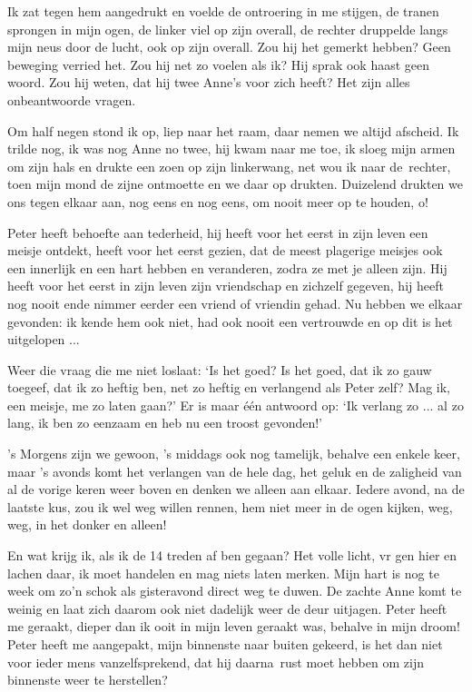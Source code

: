\documentclass{book}
\begin{document}
Ik zat tegen hem aangedrukt en voelde de ontroering in me stijgen, de
tranen sprongen in mijn ogen, de linker viel op zijn overall, de rechter
druppelde langs mijn neus door de lucht, ook op zijn overall. Zou hij
het gemerkt hebben? Geen beweging verried het. Zou hij net zo voelen als
ik? Hij sprak ook haast geen woord. Zou hij weten, dat hij twee Anne's
voor zich heeft? Het zijn alles onbeantwoorde vragen.

Om half negen stond ik op, liep naar het raam, daar nemen we altijd
afscheid. Ik trilde nog, ik was nog Anne no twee, hij kwam naar me toe,
ik sloeg mijn armen om zijn hals en drukte een zoen op zijn linkerwang,
net wou ik naar de~rechter, toen mijn mond de zijne ontmoette en we daar
op drukten. Duizelend drukten we ons tegen elkaar aan, nog eens en nog
eens, om nooit meer op te houden, o!

Peter heeft behoefte aan tederheid, hij heeft voor het eerst in zijn
leven een meisje ontdekt, heeft voor het eerst gezien, dat de meest
plagerige meisjes ook een innerlijk en een hart hebben en veranderen,
zodra ze met je alleen zijn. Hij heeft voor het eerst in zijn leven zijn
vriendschap en zichzelf gegeven, hij heeft nog nooit ende nimmer eerder
een vriend of vriendin gehad. Nu hebben we elkaar gevonden: ik kende hem
ook niet, had ook nooit een vertrouwde en op dit is het uitgelopen ...

Weer die vraag die me niet loslaat: `Is het goed? Is het goed, dat ik zo
gauw toegeef, dat ik zo heftig ben, net zo heftig en verlangend als
Peter zelf? Mag ik, een meisje, me zo laten gaan?' Er is maar één
antwoord op: `Ik verlang zo ... al zo lang, ik ben zo eenzaam en heb nu
een troost gevonden!'

's Morgens zijn we gewoon, 's middags ook nog tamelijk, behalve een
enkele keer, maar 's avonds komt het verlangen van de hele dag, het
geluk en de zaligheid van al de vorige keren weer boven en denken we
alleen aan elkaar. Iedere avond, na de laatste kus, zou ik wel weg
willen rennen, hem niet meer in de ogen kijken, weg, weg, in het donker
en alleen!

En wat krijg ik, als ik de 14 treden af ben gegaan? Het volle licht, vr
gen hier en lachen daar, ik moet handelen en mag niets laten merken.
Mijn hart is nog te week om zo'n schok als gisteravond direct weg te
duwen. De zachte Anne komt te weinig en laat zich daarom ook niet
dadelijk weer de deur uitjagen. Peter heeft me geraakt, dieper dan ik
ooit in mijn leven geraakt was, behalve in mijn droom! Peter heeft me
aangepakt, mijn binnenste naar buiten gekeerd, is het dan niet voor
ieder mens vanzelfsprekend, dat hij daarna~rust moet hebben om zijn
binnenste weer te herstellen?
\end{document}
